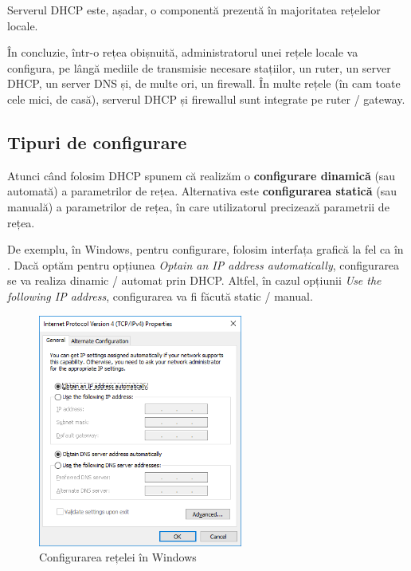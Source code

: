 Serverul DHCP este, așadar, o componentă prezentă în majoritatea rețelelor locale.

În concluzie, într-o rețea obișnuită, administratorul unei rețele locale va configura, pe lângă mediile de transmisie necesare stațiilor, un ruter, un server DHCP, un server DNS și, de multe ori, un firewall.
În multe rețele (în cam toate cele mici, de casă), serverul DHCP și firewallul sunt integrate pe ruter / gateway.

\subsection{Tipuri de configurare}
\label{sec:net:config:types}

Atunci când folosim DHCP spunem că realizăm o \textbf{configurare dinamică} (sau automată) a parametrilor de rețea.
Alternativa este \textbf{configurarea statică} (sau manuală) a parametrilor de rețea, în care utilizatorul precizează parametrii de rețea.

De exemplu, în Windows, pentru configurare, folosim interfața grafică la fel ca în .
Dacă optăm pentru opțiunea \textit{Optain an IP address automatically}, configurarea se va realiza dinamic / automat prin DHCP.
Altfel, în cazul opțiunii \textit{Use the following IP address}, configurarea va fi făcută static / manual.

\begin{figure}[!htbp]
  \centering
  \includegraphics[width=0.6\textwidth]{chapters/11-net/img/windows-config.png}
  \caption{Configurarea rețelei în Windows}
  \label{fig:net:windows-config}
\end{figure}

